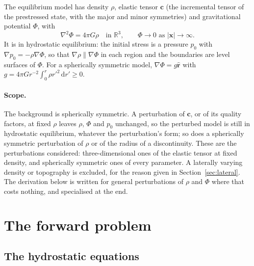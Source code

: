 \documentclass[11pt,a4paper]{article}
\newcommand{\bc}{\mathbf{c}}
\newcommand{\br}{\hat{\mathbf{r}}}
\newcommand{\bx}{\mathbf{x}}
\newcommand{\dd}{\,\mathrm{d}}
\theoremstyle{remark}
\begin{document}
The equilibrium model has density $\rho$, elastic tensor $\bc$ (the
incremental tensor of the prestressed state, with the major and minor
symmetries) and gravitational potential $\Phi$, with
\begin{equation}
  \nabla^2\Phi = 4\pi G\rho \quad\text{in } \mathbb{R}^3,
  \qquad \Phi\to0 \text{ as } |\bx|\to\infty. \label{eq:poisson-eq}
\end{equation}
It is in hydrostatic equilibrium: the initial stress is a pressure $p_0$
with $\nabla p_0 = -\rho\nabla\Phi$, so that $\nabla\rho\parallel\nabla\Phi$
in each region and the boundaries are level surfaces of $\Phi$. For a
spherically symmetric model, $\nabla\Phi = g\br$ with $g = 4\pi G
r^{-2}\int_0^r\rho r'^2\dd r' \ge 0$.

\paragraph{Scope.} The background is spherically symmetric. A perturbation of
$\bc$, or of its quality factors, at fixed $\rho$ leaves $\rho$, $\Phi$ and
$p_0$ unchanged, so the perturbed model is still in hydrostatic equilibrium,
whatever the perturbation's form; so does a spherically symmetric
perturbation of $\rho$ or of the radius of a discontinuity. These are the
perturbations considered: three-dimensional ones of the elastic tensor at
fixed density, and spherically symmetric ones of every parameter. A
laterally varying density or topography is excluded, for the reason given in
Section~\ref{sec:lateral}. The derivation below is written for general
perturbations of $\rho$ and $\Phi$ where that costs nothing, and specialised
at the end.

\section{The forward problem}

\subsection{The hydrostatic equations}
\end{document}
